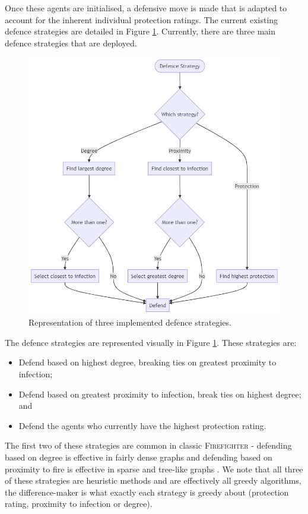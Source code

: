 \documentclass[../report.tex]{subfiles}
\begin{document}
Once these agents are initialised, a defensive move is made that is adapted to account for the inherent individual protection ratings. The current existing defence strategies are detailed in Figure \ref{fig:defence}. Currently, there are three main defence strategies that are deployed.

\begin{figure}[!ht]
  \centering
  \includegraphics[width=0.75\linewidth]{assets/defence}
  \caption{Representation of three implemented defence strategies.}
\label{fig:defence}
\end{figure}

The defence strategies are represented visually in Figure \ref{fig:defence}. These strategies are:
\begin{itemize}
	\item Defend based on highest degree, breaking ties on greatest proximity to infection;
	\item Defend based on greatest proximity to infection, break ties on highest degree; and
	\item Defend the agents who currently have the highest protection rating.
\end{itemize}
The first two of these strategies are common in classic {\scshape Firefighter} - defending based on degree is effective in fairly dense graphs and defending based on proximity to fire is effective in sparse and tree-like graphs \cite{finbow_2009}. We note that all three of these strategies are heuristic methods and are effectively all greedy algorithms, the difference-maker is what exactly each strategy is greedy about (protection rating, proximity to infection or degree).
\end{document}
